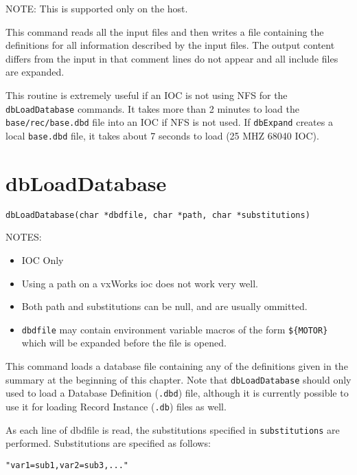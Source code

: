 NOTE: This is supported only on the host.

This command reads all the input files and then writes a file containing the definitions for all information described by the input files.
The output content differs from the input in that comment lines do not appear and all include files are expanded.

This routine is extremely useful if an IOC is not using NFS for the \verb|dbLoadDatabase| commands.
It takes more than 2 minutes to load the \verb|base/rec/base.dbd| file into an IOC if NFS is not used.
If \verb|dbExpand| creates a local \verb|base.dbd| file, it takes about 7 seconds to load (25 MHZ 68040 IOC).

\section{dbLoadDatabase}

\begin{verbatim}
dbLoadDatabase(char *dbdfile, char *path, char *substitutions)
\end{verbatim}

NOTES: 

\begin{itemize}
\item IOC Only

\item Using a path on a vxWorks ioc does not work very well.

\item Both path and substitutions can be null, and are usually ommitted.

\item \verb|dbdfile| may contain environment variable macros of the form \verb|${MOTOR}| which will be expanded before the file is opened.

\end{itemize}

This command loads a database file containing any of the definitions given in the summary at the beginning of this chapter.
Note that \verb|dbLoadDatabase| should only used to load a Database Definition (\verb|.dbd|) file, although it is currently possible to use it for loading Record Instance (\verb|.db|) files as well.

As each line of dbdfile is read, the substitutions specified in \verb|substitutions| are performed. Substitutions are specified as follows:

\begin{verbatim}
"var1=sub1,var2=sub3,..."
\end{verbatim}

